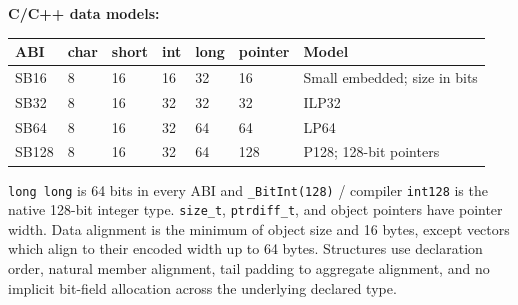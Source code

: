 \documentclass[11pt]{article}
\begin{document}
\textbf{C/C++ data models:}
\begin{table}[h]
\centering
\begin{tabular}{@{}L{2.0cm}C{1.2cm}C{1.2cm}C{1.2cm}C{1.2cm}C{1.7cm}L{2.7cm}@{}}
\toprule
\textbf{ABI} & \textbf{char} & \textbf{short} & \textbf{int} & \textbf{long} & \textbf{pointer} & \textbf{Model} \\ \midrule
SB16 & 8 & 16 & 16 & 32 & 16 & Small embedded; size in bits \\
SB32 & 8 & 16 & 32 & 32 & 32 & ILP32 \\
SB64 & 8 & 16 & 32 & 64 & 64 & LP64 \\
SB128 & 8 & 16 & 32 & 64 & 128 & P128; 128-bit pointers \\ \bottomrule
\end{tabular}
\end{table}

\texttt{long long} is 64 bits in every ABI and \texttt{\_BitInt(128)} / compiler \texttt{int128} is the native 128-bit integer type. \texttt{size\_t}, \texttt{ptrdiff\_t}, and object pointers have pointer width. Data alignment is the minimum of object size and 16 bytes, except vectors which align to their encoded width up to 64 bytes. Structures use declaration order, natural member alignment, tail padding to aggregate alignment, and no implicit bit-field allocation across the underlying declared type.
\end{document}
